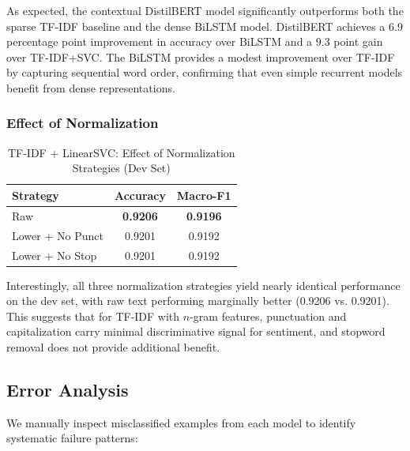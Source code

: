 \documentclass[12pt, a4paper]{article}
\begin{document}
As expected, the contextual DistilBERT model significantly outperforms both the sparse TF-IDF baseline and the dense BiLSTM model. DistilBERT achieves a 6.9 percentage point improvement in accuracy over BiLSTM and a 9.3 point gain over TF-IDF+SVC. The BiLSTM provides a modest improvement over TF-IDF by capturing sequential word order, confirming that even simple recurrent models benefit from dense representations.

\subsubsection{Effect of Normalization}

\begin{table}[H]
\centering
\caption{TF-IDF + LinearSVC: Effect of Normalization Strategies (Dev Set)}
\label{tab:task1_norm}
\begin{tabular}{lcc}
\toprule
\textbf{Strategy} & \textbf{Accuracy} & \textbf{Macro-F1} \\
\midrule
Raw & \textbf{0.9206} & \textbf{0.9196} \\
Lower + No Punct & 0.9201 & 0.9192 \\
Lower + No Stop & 0.9201 & 0.9192 \\
\bottomrule
\end{tabular}
\end{table}

Interestingly, all three normalization strategies yield nearly identical performance on the dev set, with raw text performing marginally better (0.9206 vs. 0.9201). This suggests that for TF-IDF with $n$-gram features, punctuation and capitalization carry minimal discriminative signal for sentiment, and stopword removal does not provide additional benefit.

\subsection{Error Analysis}

We manually inspect misclassified examples from each model to identify systematic failure patterns:
\end{document}
